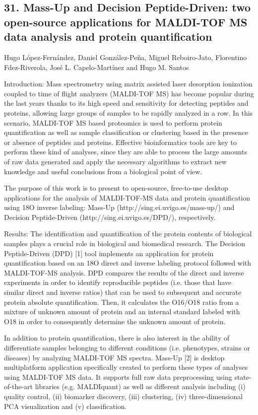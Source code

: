 \subsection*{\color{eubicRed} 31. Mass-Up and Decision Peptide-Driven: two open-source applications for MALDI-TOF MS data analysis and protein quantification}
{\color{eubicGray}Hugo López-Fernández, Daniel González-Peña, Miguel Reboiro-Jato, Florentino Fdez-Riverola, José L. Capelo-Martínez and Hugo M. Santos}

Introduction: Mass spectrometry using matrix assisted laser desorption ionization coupled to time of flight analyzers (MALDI-TOF MS) has become popular during the last years thanks to its high speed and sensitivity for detecting peptides and proteins, allowing large groups of samples to be rapidly analyzed in a row. In this scenario, MALDI-TOF MS based proteomics is used to perform protein quantification as well as sample classification or clustering based in the presence or absence of peptides and proteins. Effective bioinformatics tools are key to perform these kind of analyses, since they are able to process the large amounts of raw data generated and apply the necessary algorithms to extract new knowledge and useful conclusions from a biological point of view.

The purpose of this work is to present to open-source, free-to-use desktop applications for the analysis of MALDI-TOF-MS data and protein quantification using 18O inverse labeling: Mass-Up (http://sing.ei.uvigo.es/mass-up/) and Decision Peptide-Driven (http://sing.ei.uvigo.es/DPD/), respectively.


Results: The identification and quantification of the protein contents of biological samples plays a crucial role in biological and biomedical research. The Decision Peptide-Driven (DPD) [1] tool implements an application for protein quantification based on an 18O direct and inverse labeling protocol followed with MALDI-TOF-MS analysis. DPD compares the results of the direct and inverse experiments in order to identify reproducible peptides (i.e. those that have similar direct and inverse ratios) that can be used to subsequent and accurate protein absolute quantification. Then, it calculates the O16/O18 ratio from a mixture of unknown amount of protein and an internal standard labeled with O18 in order to consequently determine the unknown amount of protein.

In addition to protein quantification, there is also interest in the ability of differentiate samples belonging to different conditions (i.e. phenotypes, strains or diseases) by analyzing MALDI-TOF MS spectra. Mass-Up [2] is desktop multiplatform application specifically created to perform these types of analyses using MALDI-TOF MS data. It supports full raw data preprocessing using state-of-the-art libraries (e.g. MALDIquant) as well as different analysis including (i) quality control, (ii) biomarker discovery, (iii) clustering, (iv) three-dimensional PCA visualization and (v) classification.


